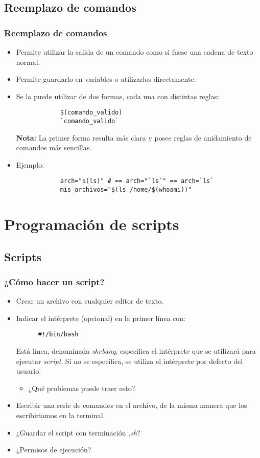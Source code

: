 \subsection{Reemplazo de comandos}
\begin{frame}[fragile]
	\frametitle{Reemplazo de comandos}
	\begin{itemize}
		\item Permite utilizar la salida de un comando como si fuese una cadena de texto normal.
		\item Permite guardarlo en variables o utilizarlos directamente.
		\item Se la puede utilizar de dos formas, cada una con distintas reglas:
		\begin{lstlisting}
			$(comando_valido)‏
			`comando_valido`
		\end{lstlisting}
		\textbf{Nota:} La primer forma resulta más clara y posee reglas de anidamiento de comandos más sencillas.
		\item Ejemplo:
		\begin{lstlisting}
			arch="$(ls)" # == arch="`ls`" == arch=`ls`
			mis_archivos="$(ls /home/$(whoami))"
		\end{lstlisting}
	\end{itemize}
\end{frame}

\section{Programación de scripts}
\subsection{Scripts}
\begin{frame}[fragile]
  \frametitle{¿Cómo hacer un script?}
  \begin{itemize}
  \item Crear un archivo con cualquier editor de texto.
    \pause
  \item Indicar el intérprete (opcional) en la primer línea con:
    \begin{lstlisting}
      #!/bin/bash
    \end{lstlisting}
    Está línea, denominada \textit{shebang}, especifica el intérprete
    que se utilizará para ejecutar \textit{script}. Si no se
    especifica, se utiliza el intérprete por defecto del usuario.
    \begin{itemize}
      \pause
    \item   ¿Qué problemas puede traer esto?
    \end{itemize}
    \pause
  \item Escribir una serie de comandos en el archivo, de la misma manera
    que los escribiriamos en la terminal.
    \pause
  \item ¿Guardar el script con terminación \textit{.sh}?
    \pause
  \item ¿Permisos de ejecución?
  \end{itemize}
\end{frame}

